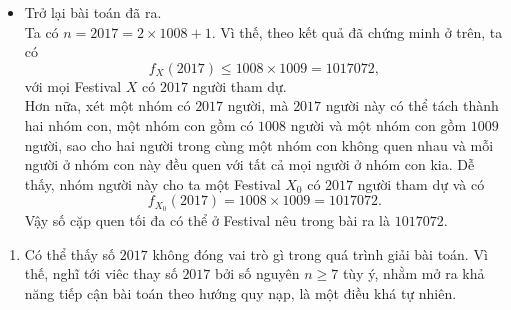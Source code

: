 \begin{bt}
{\begin{itemize}
\begin{itemize}
				Vì vậy, ta có điều phải chứng minh.
				\item[+] Gải sử (1) đúng với $n=2k,\ k \geq 4;$ nghĩa là, ta có $$f_X(2k) \leq k^2,\ k\geq 4,$$ với mọi Festival $X$ có $2k$ người tham dự.\\
				Xét $n=2k+1.$ Ta cần chứng minh $$f_X(2k+1) \leq k(k+1),$$ với mọi Festival$X$ có $2k+1$ người tham dự.\\
				Giả sử ngược lại, tồn tại một Festival $X$ có $2k+1$ người tham dự và $$f_X(2k+1)\geq k(k+1)+1=k^2+k+1.$$ Khi đó bằng cách cho một số thích hợp các cặp quen nhau trở thành không quen nhau, ta sẽ có Festival $Y$ có $2k+1$ người tham dự và $$f_Y(2k+1)=k^2+k+1. \eqno (3)$$
				Dễ thấy, ở Festival $Y$, phải tồn tại một người quen với tối đa $k$ người khác, vì nếu ngược lại, một người quen với ít nhất $k+1$ người khác thì $$f_Y(2k+1) \geq \dfrac{(2k+1)(k+1)}{2}\geq =k^2+k \geq k^2+4$$ (do  $k\geq 4$ và $f_Y(2k+1) \in \mathbb{Z}$), mâu thuẫn với (3).\\
				Tách người quan với tối đa $k$ người khác ra khỏi Festival $Y$, ta sẽ có Festival $Z$ có $2k$ người tham dự và $$f_Z(2k) \geq k^2+k+1-k=k^2+1,$$ trái với giả thiết quy nạp.\\
				Vì vậy, ta có điều cần chứng minh.
				\item[+] Vậy, tóm lại, theo nguyên lí quy nạp, (1) được chứng minh.
			\end{itemize}
			\item Trở lại bài toán đã ra.\\
			Ta có $n=2017=2 \times 1008+1$. Vì thế, theo kết quả đã chứng minh ở trên, ta có $$f_X(2017) \leq 1008 \times 1009 =1017072,$$ với mọi Festival $X$ có $2017$ người tham dự.\\
			Hơn nữa, xét một nhóm có $2017$ người, mà $2017$ người này có thể tách thành hai nhóm con, một nhóm con gồm có $1008$ người và một nhóm con gồm $1009$ người, sao cho hai người trong cùng một nhóm con không quen nhau và mỗi người ở nhóm con này đều quen với tất cả mọi người ở nhóm con kia. Dễ thấy, nhóm người này cho ta một Festival $X_0$ có $2017$ người tham dự và có $$f_{X_0}(2017)=1008 \times 1009 =1017072.$$
			Vậy số cặp quen tối đa có thể ở Festival nêu trong bài ra là $1017072$.
		\end{itemize}
		\begin{nx} \hfill 
			\begin{enumerate}[1.]
				\item Có thể thấy số $2017$ không đóng vai trò gì trong quá trình giải bài toán. Vì thế, nghĩ tới viêc thay số $2017$ bởi số nguyên $n\geq 7$ tùy ý, nhằm mở ra khả năng tiếp cận bài toán theo hướng quy nạp, là một điều khá tự nhiên.\\

\end{enumerate}
\end{nx}}
\end{bt}
